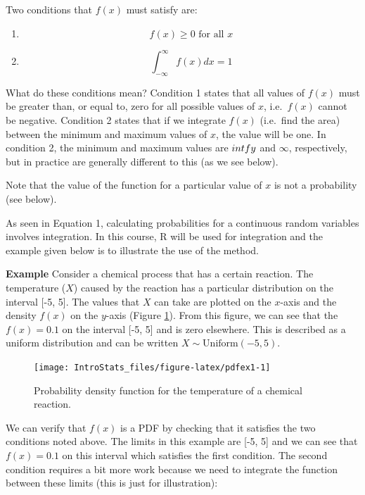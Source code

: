 \documentclass[
  oneside]{krantz}
\begin{document}
Two conditions that \(f(x)\) must satisfy are:

\begin{enumerate}
\def\labelenumi{\arabic{enumi}.}
\item
  \[f(x) \ge 0 \textrm{ for all } x\]
\item
  \[\int _{- \infty}^{\infty} f(x)dx = 1 \]
\end{enumerate}

What do these conditions mean? Condition 1 states that all values of \(f(x)\) must be greater than, or equal to, zero for all possible values of \(x\), i.e.~\(f(x)\) cannot be negative. Condition 2 states that if we integrate \(f(x)\) (i.e.~find the area) between the minimum and maximum values of \(x\), the value will be one. In condition 2, the minimum and maximum values are \(\-intfy\) and \(\infty\), respectively, but in practice are generally different to this (as we see below).

Note that the value of the function for a particular value of \(x\) is not a probability (see below).

As seen in Equation 1, calculating probabilities for a continuous random variables involves integration. In this course, R will be used for integration and the example given below is to illustrate the use of the method.

\textbf{Example} Consider a chemical process that has a certain reaction. The temperature (\(X\)) caused by the reaction has a particular distribution on the interval {[}-5, 5{]}. The values that \(X\) can take are plotted on the \(x\)-axis and the density \(f(x)\) on the \(y\)-axis (Figure \ref{fig:pdfex1}). From this figure, we can see that the \(f(x)=0.1\) on the interval {[}-5, 5{]} and is zero elsewhere. This is described as a uniform distribution and can be written \(X \sim \textrm{Uniform} (-5, 5)\).

\begin{figure}

{\centering \texttt{[image: IntroStats\_files/figure-latex/pdfex1-1]} 

}

\caption{Probability density function for the temperature of a chemical reaction.}\label{fig:pdfex1}
\end{figure}

We can verify that \(f(x)\) is a PDF by checking that it satisfies the two conditions noted above. The limits in this example are {[}-5, 5{]} and we can see that \(f(x)=0.1\) on this interval which satisfies the first condition. The second condition requires a bit more work because we need to integrate the function between these limits (this is just for illustration):
\end{document}
